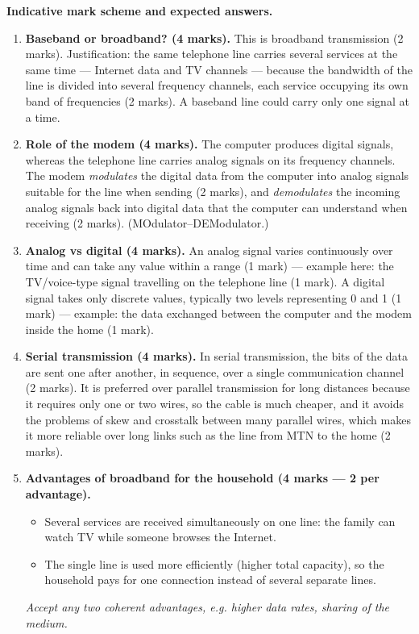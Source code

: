 \documentclass[11pt]{article}
\newcommand{\cle}[1]{{\popxbold\color{popdark}#1}}
\begin{document}
\begin{corrige}
\textbf{Indicative mark scheme and expected answers.}

\begin{enumerate}
\item \textbf{Baseband or broadband? (4 marks).} This is \cle{broadband} transmission (2 marks). Justification: the same telephone line carries several services at the same time — Internet data and TV channels — because the bandwidth of the line is divided into several frequency channels, each service occupying its own band of frequencies (2 marks). A baseband line could carry only one signal at a time.

\item \textbf{Role of the modem (4 marks).} The computer produces digital signals, whereas the telephone line carries analog signals on its frequency channels. The modem \emph{modulates} the digital data from the computer into analog signals suitable for the line when sending (2 marks), and \emph{demodulates} the incoming analog signals back into digital data that the computer can understand when receiving (2 marks). (MOdulator--DEModulator.)

\item \textbf{Analog vs digital (4 marks).} An \cle{analog} signal varies continuously over time and can take any value within a range (1 mark) — example here: the TV/voice-type signal travelling on the telephone line (1 mark). A \cle{digital} signal takes only discrete values, typically two levels representing 0 and 1 (1 mark) — example: the data exchanged between the computer and the modem inside the home (1 mark).

\item \textbf{Serial transmission (4 marks).} In serial transmission, the bits of the data are sent one after another, in sequence, over a single communication channel (2 marks). It is preferred over parallel transmission for long distances because it requires only one or two wires, so the cable is much cheaper, and it avoids the problems of skew and crosstalk between many parallel wires, which makes it more reliable over long links such as the line from MTN to the home (2 marks).

\item \textbf{Advantages of broadband for the household (4 marks — 2 per advantage).}
\begin{itemize}
\item Several services are received simultaneously on one line: the family can watch TV while someone browses the Internet.
\item The single line is used more efficiently (higher total capacity), so the household pays for one connection instead of several separate lines.
\end{itemize}
\emph{Accept any two coherent advantages, e.g. higher data rates, sharing of the medium.}
\end{enumerate}
\end{corrige}
\end{document}
